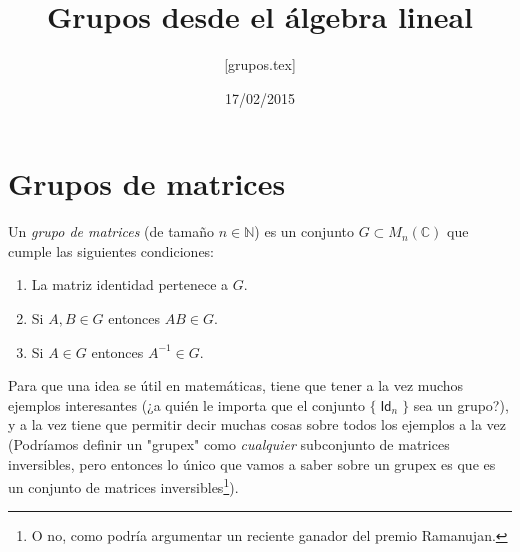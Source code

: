 \documentclass[11pt,fleqn]{article}
\title{Grupos desde el \'algebra lineal}
\author{[grupos.tex]}
\date{17/02/2015}
\newcommand\NN{\mathbb N}
\newcommand\CC{\mathbb C}
\DeclareMathOperator\Id{\mathsf{Id}}
\begin{document}
\maketitle
\section{Grupos de matrices}
\begin{Definition}
	Un \emph{grupo de matrices} (de tamaño $n \in \NN$) es un conjunto $G \subset M_n(\CC)$
	que cumple las siguientes condiciones:
	\begin{enumerate}
		\item La matriz identidad pertenece a $G$.
		\item Si $A, B \in G$ entonces $AB \in G$.
		\item Si $A \in G$ entonces $A^{-1} \in G$.
	\end{enumerate}
\end{Definition}
Para que una idea se útil en matemáticas, tiene que tener a la vez muchos ejemplos
interesantes (¿a quién le importa que el conjunto $\{\Id_n\}$ sea un grupo?), y a la vez
tiene que permitir decir muchas cosas sobre todos los ejemplos a la vez (Podríamos definir
un "grupex" como \emph{cualquier} subconjunto de matrices inversibles, pero entonces lo
único que vamos a saber sobre un grupex es que es un conjunto de matrices
inversibles\footnote{O no, como podría argumentar un reciente ganador del premio
Ramanujan.}).
\end{document}

